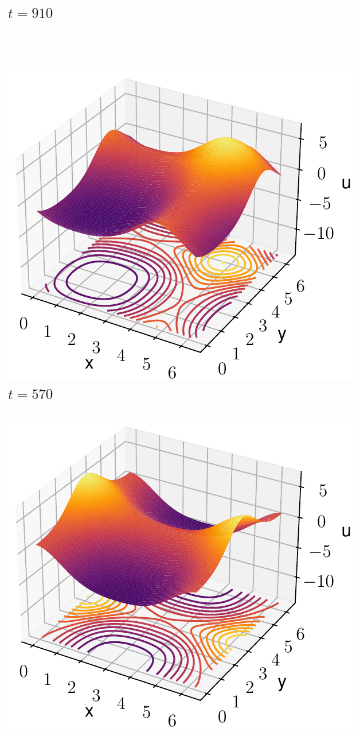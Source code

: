 \documentclass[twoside]{article}
\begin{document}
\begin{figure}[ht]
\begin{subfigure}[ht]{0.248\textwidth}
    \caption{$t= 910$}
    \label{fig:he_b}
  \end{subfigure}\\\hfill
  \begin{subfigure}[ht]{0.248\textwidth}
    \includegraphics[width=\textwidth]{images/slice_nu1_0.4_nu2_0.4_time_570.0.pdf}
    \caption{$t= 570$}
  \end{subfigure}\hfill
  \begin{subfigure}[ht]{0.248\textwidth}
    \includegraphics[width=\textwidth]{images/slice_nu1_0.4_nu2_0.4_time_860.0.pdf}

\end{subfigure}
\end{figure}
\end{document}
